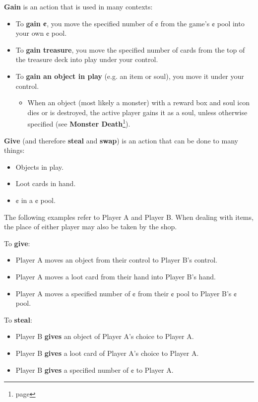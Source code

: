 \documentclass[a4paper, twoside]{report} %
\begin{document}
    \textbf{Gain} is an action that is used in many contexts:
    \begin{itemize}
        \item To \textbf{gain ¢}, you move the specified number of ¢ from the game’s ¢ pool into your own ¢ pool.
        \item To \textbf{gain treasure}, you move the specified number of cards from the top of the treasure deck into play under your control.
        \item To \textbf{gain an object in play} (e.g. an item or soul), you move it under your control.
        \begin{itemize}
            \item When an object (most likely a monster) with a reward box and soul icon dies or is destroyed, the active player gains it as a soul, unless otherwise specified (see \textbf{Monster Death}\footnote{page \pageref{monsterdeath}}).  
        \end{itemize}
    \end{itemize}
    \textbf{Give} (and therefore \textbf{steal} and \textbf{swap}) is an action that can be done to many things:      
    \begin{itemize}
        \item Objects in play.
        \item Loot cards in hand.
        \item ¢ in a ¢ pool.
    \end{itemize}
    The following examples refer to Player A and Player B. When dealing with items, the place of either player may also be taken by the shop.
    
    To \textbf{give}:
    \begin{itemize}
        \item Player A moves an object from their control to Player B’s control.
        \item Player A moves a loot card from their hand into Player B’s hand.
        \item Player A moves a specified number of ¢ from their ¢ pool to Player B’s ¢ pool.
    \end{itemize}

    To \textbf{steal}:
    \begin{itemize}
        \item Player B \textbf{gives} an object of Player A’s choice to Player A.
        \item Player B \textbf{gives} a loot card of Player A’s choice to Player A.
        \item Player B \textbf{gives} a specified number of ¢ to Player A.
    \end{itemize}
\end{document}

